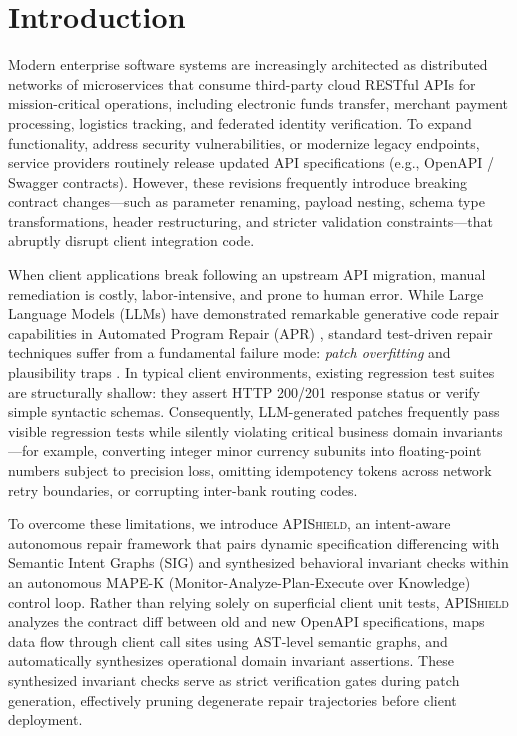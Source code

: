 \section{Introduction}
\label{sec:intro}

Modern enterprise software systems are increasingly architected as distributed networks of microservices that consume third-party cloud RESTful APIs for mission-critical operations, including electronic funds transfer, merchant payment processing, logistics tracking, and federated identity verification. To expand functionality, address security vulnerabilities, or modernize legacy endpoints, service providers routinely release updated API specifications (e.g., OpenAPI / Swagger contracts). However, these revisions frequently introduce breaking contract changes---such as parameter renaming, payload nesting, schema type transformations, header restructuring, and stricter validation constraints---that abruptly disrupt client integration code.

When client applications break following an upstream API migration, manual remediation is costly, labor-intensive, and prone to human error. While Large Language Models (LLMs) have demonstrated remarkable generative code repair capabilities in Automated Program Repair (APR) \cite{chatrepair2024, swebench2024, repairagent2024}, standard test-driven repair techniques suffer from a fundamental failure mode: \textit{patch overfitting} and plausibility traps \cite{plausibility2015}. In typical client environments, existing regression test suites are structurally shallow: they assert HTTP 200/201 response status or verify simple syntactic schemas. Consequently, LLM-generated patches frequently pass visible regression tests while silently violating critical business domain invariants---for example, converting integer minor currency subunits into floating-point numbers subject to precision loss, omitting idempotency tokens across network retry boundaries, or corrupting inter-bank routing codes.

To overcome these limitations, we introduce \textsc{APIShield}, an intent-aware autonomous repair framework that pairs dynamic specification differencing with Semantic Intent Graphs (SIG) and synthesized behavioral invariant checks within an autonomous MAPE-K (Monitor-Analyze-Plan-Execute over Knowledge) control loop. Rather than relying solely on superficial client unit tests, \textsc{APIShield} analyzes the contract diff between old and new OpenAPI specifications, maps data flow through client call sites using AST-level semantic graphs, and automatically synthesizes operational domain invariant assertions. These synthesized invariant checks serve as strict verification gates during patch generation, effectively pruning degenerate repair trajectories before client deployment.

